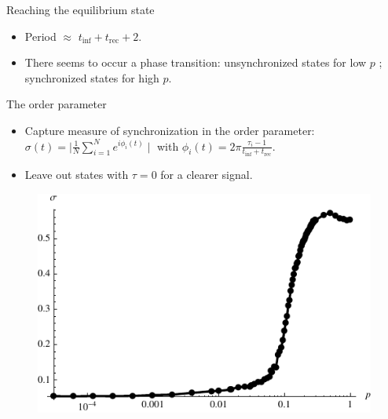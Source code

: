 \documentclass[blackandwhite]{beamer}
\begin{document}
\begin{frame}{Reaching the equilibrium state}
\begin{figure}
{	}
	\end{figure}
	\begin{itemize}
	\item
	Period $\approx$ $t_{\text{inf}} + t_{\text{rec}} + 2$.
	\item
	There seems to occur a phase transition: unsynchronized states for low $p$ ; synchronized states for high $p$.
	\end{itemize}	
\end{frame}

\begin{frame}{The order parameter}
	\begin{itemize}
	\item
	Capture measure of synchronization in the order parameter: $\sigma (t) = \mid \frac{1}{N} \sum_{i = 1}^{N} e^{i \phi_{i} (t)} \mid$ with $\phi_{i} (t) = 2 \pi \frac{\tau_{i} - 1}{t_{\text{inf}} + t_{\text{rec}}}$.
	\item
	Leave out states with $\tau = 0$ for a clearer signal.
	\end{itemize}
	\begin{center}
	\begin{figure}
	\includegraphics[scale=0.5]{sigma.pdf}
	\end{figure}
	\end{center}
\end{frame}
\end{document}
